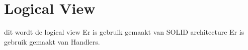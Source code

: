 \section{Logical View}
dit wordt de logical view
Er is gebruik gemaakt van SOLID architecture
Er is gebruik gemaakt van Handlers.
